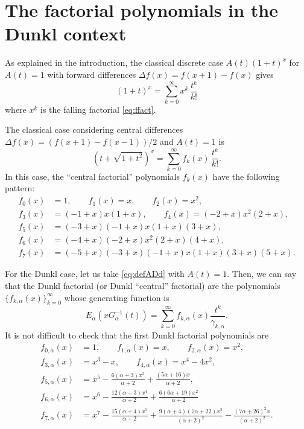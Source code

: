 \documentclass[11pt]{article}
\theoremstyle{plain}
\theoremstyle{remark}
\numberwithin{equation}{section} %
\newcommand{\Ea}{E_{\alpha}}
\newcommand{\cc}{\gamma}
\begin{document}
\section{The factorial polynomials in the Dunkl context}
\label{sec:fallfact}

As explained in the introduction, the classical discrete case 
$A(t)(1+t)^x$ for $A(t)=1$ with forward differences
$\Delta f(x) = f(x+1)-f(x)$ gives
\[
(1+t)^x = \sum_{k=0}^{\infty} x^{\underline{k}} \, \frac{t^k}{k!}
\]
where $x^{\underline{k}}$ is the falling factorial \eqref{eq:ffact}.

The classical case considering central differences $\Delta f(x) = (f(x+1)-f(x-1))/2$
and $A(t) = 1$ is
\[
(t+\sqrt{1+t^2})^x = \sum_{k=0}^{\infty} f_k(x) \, \frac{t^k}{k!}.
\]
In this case, the ``central factorial'' polynomials $f_k(x)$ have the following pattern:
\begin{equation}
\label{eq:clascentral}
\begin{aligned}
f_0(x) &= 1, \qquad
f_1(x) = x, \qquad
f_2(x) = x^2, \\
f_3(x) &= (-1+x) x (1+x), \qquad
f_4(x) = (-2+x) x^2 (2+x), \\
f_5(x) &= (-3+x) (-1+x) x (1+x) (3+x), \\
f_6(x) &= (-4+x) (-2+x) x^2 (2+x) (4+x), \\
f_7(x) &= (-5+x) (-3+x) (-1+x) x (1+x) (3+x) (5+x).
\end{aligned}
\end{equation}

For the Dunkl case, let us take \eqref{eq:defADd} with $A(t)=1$.
Then, we can say that the Dunkl factorial (or Dunkl ``central'' factorial)
are the polynomials  
$\{f_{k,\alpha}(x)\}_{k=0}^{\infty}$ whose generating function is
\begin{equation}
\label{eq:fallfka}
  \Ea(x G_{\alpha}^{-1}(t)) = \sum_{k=0}^{\infty} f_{k,\alpha}(x) \frac{t^k}{\cc_{k,\alpha}}.
\end{equation}
It is not difficult to check that the first Dunkl factorial polynomials are
\begin{align*}
f_{0,\alpha}(x) &= 1, \qquad
f_{1,\alpha}(x) = x, \qquad
f_{2,\alpha}(x) = x^2, \\
f_{3,\alpha}(x) &= x^3-x, \qquad
f_{4,\alpha}(x) = x^4 - 4x^2, \\
f_{5,\alpha}(x) &= x^5
  - \frac{6(\alpha+3) x^3}{\alpha+2}
  + \frac{(5\alpha+16) x}{\alpha+2}, \\
f_{6,\alpha}(x) &= x^6
  - \frac{12(\alpha+3)x^4}{\alpha+2}
  + \frac{6(6\alpha+19) x^2}{\alpha+2} \\
f_{7,\alpha}(x) &= x^7
  - \frac{15(\alpha+4) x^5}{\alpha+2}
  + \frac{9(\alpha+4)(7\alpha+22) x^3}{(\alpha+2)^2}
  - \frac{(7\alpha+26)^2 x}{(\alpha+2)^2}.
\end{align*}
\end{document}
